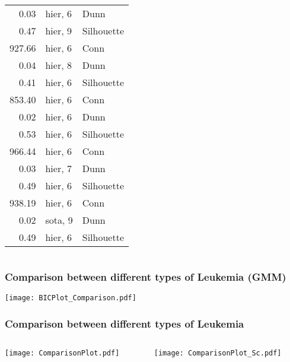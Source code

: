 \documentclass[10pt,dvipsnames,table]{beamer}
\begin{document}
\begin{frame}
\begin{columns}
\begin{column}{.5\textwidth}
\begin{table}[ht]
{\begin{tabular}{rll}
  0.03 & hier, 6 & Dunn \\ 
  0.47 & hier, 9 & Silhouette \\ 
  927.66 & hier, 6 & Conn \\ 
  0.04 & hier, 8 & Dunn \\ 
  0.41 & hier, 6 & Silhouette \\ 
  853.40 & hier, 6 & Conn \\ 
  0.02 & hier, 6 & Dunn \\ 
  0.53 & hier, 6 & Silhouette \\ 
  966.44 & hier, 6 & Conn \\ 
  0.03 & hier, 7 & Dunn \\ 
  0.49 & hier, 6 & Silhouette \\ 
  938.19 & hier, 6 & Conn \\ 
  0.02 & sota, 9 & Dunn \\ 
  0.49 & hier, 6 & Silhouette \\ 
   \hline
\end{tabular}
}
\end{table}
\end{column}
\end{columns}
\end{frame}

\begin{frame}
\frametitle{Comparison between different types of Leukemia (GMM)}
\begin{center}
\texttt{[image: BICPlot\_Comparison.pdf]} \\
\end{center}
\end{frame}

\begin{frame}
\frametitle{Comparison between different types of Leukemia}
\begin{columns}
\begin{column}{.5\textwidth}
\texttt{[image: ComparisonPlot.pdf]} \\
\end{column}
\begin{column}{.5\textwidth}
\texttt{[image: ComparisonPlot\_Sc.pdf]} \\
\end{column}
\end{columns}
\end{frame}
\end{document}
